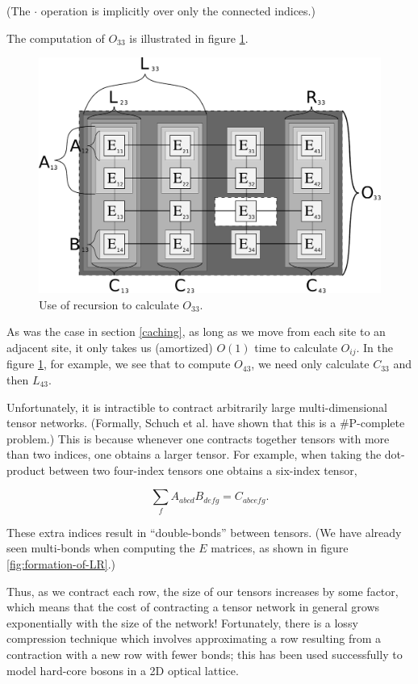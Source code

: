 \documentclass[12pt]{amsbook}
\theoremstyle{plain}
\theoremstyle{definition}
\theoremstyle{remark}
\begin{document}
\noindent (The $\cdot$ operation is implicitly over only the connected indices.)

The computation of $O_{33}$ is illustrated in figure \ref{fig:2d-recursive-structure}.

\begin{figure}
\centering
\includegraphics[width=\columnwidth]{images/mypaper-diagram-38}
\caption{Use of recursion to calculate $O_{33}$. \label{fig:2d-recursive-structure}}
\end{figure}

As was the case in section \ref{caching}, as long as we move from each site to an adjacent site, it only takes us (amortized) $O(1)$ time to calculate $O_{ij}$.  In the figure \ref{fig:2d-recursive-structure}, for example, we see that to compute $O_{43}$, we need only calculate $C_{33}$ and then $L_{43}$.

Unfortunately, it is intractible to contract arbitrarily large multi-dimensional tensor networks.  (Formally, Schuch et al. \cite{quant-ph/0611050} have shown that this is a \#P-complete problem.)  This is because whenever one contracts together tensors with more than two indices, one obtains a larger tensor.  For example, when taking the dot-product between two four-index tensors one obtains a six-index tensor,

$$\sum_f A_{abcd} B_{defg} = C_{abcefg}.$$

\noindent These extra indices result in ``double-bonds'' between tensors.  (We have already seen multi-bonds when computing the $E$ matrices, as shown in figure \ref{fig:formation-of-LR}.)

Thus, as we contract each row, the size of our tensors increases by some factor, which means that the cost of contracting a tensor network in general grows exponentially with the size of the network!  Fortunately, there is a lossy compression technique which involves approximating a row resulting from a contraction with a new row with fewer bonds;  this has been used successfully to model hard-core bosons in a 2D optical lattice\cite{cond-mat/0611522}.
\end{document}
